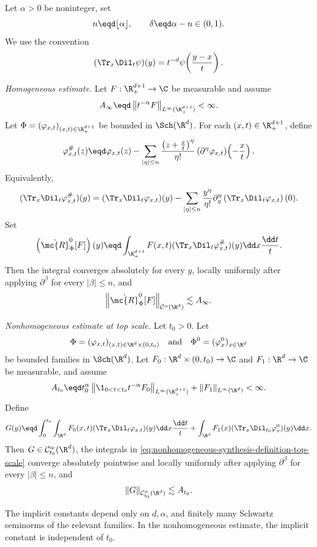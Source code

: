 \begin{proposition} \label{prop:holder-synthesis} Let \(\alpha>0\) be noninteger, set
\[
n\eqd \lfloor\alpha\rfloor,
\qquad
\delta\eqd \alpha-n\in(0,1).
\]
We use the convention
\[
(\Tr_x\Dil_t\psi)(y)=t^{-d}\psi\!\left(\frac{y-x}{t}\right).
\]

\smallskip \noindent \emph{Homogeneous estimate.} Let \(F:\R^{d+1}_+\to\C\) be measurable and assume
\[
A_\infty\eqd
\left\|t^{-\alpha}F\right\|_{L^\infty(\R^{d+1}_+)}
<\infty .
\]
Let \(\Phi=(\varphi_{x,t})_{(x,t)\in\R^{d+1}_+}\) be bounded in \(\Sch(\R^d)\).
For each \((x,t)\in\R^{d+1}_+\), define
\[
\varphi^{\#}_{x,t}(z)
\eqd
\varphi_{x,t}(z)
-
\sum_{|\eta|\le n}
\frac{\left(z+\frac{x}{t}\right)^\eta}{\eta!}
\left(\partial^\eta\varphi_{x,t}\right)\!\left(-\frac{x}{t}\right).
\]
Equivalently,
\[
(\Tr_x\Dil_t\varphi^{\#}_{x,t})(y)
=
(\Tr_x\Dil_t\varphi_{x,t})(y)
-
\sum_{|\eta|\le n}
\frac{y^\eta}{\eta!}
\partial_y^\eta
\left(\Tr_x\Dil_t\varphi_{x,t}\right)(0).
\]
Set
\[
\left(\dot{\mc{R}}^0_{\Phi}[F]\right)(y)
\eqd
\int_{\R^{d+1}_+}
F(x,t)
(\Tr_x\Dil_t\varphi^{\#}_{x,t})(y)
\dd x\frac{\dd t}{t}.
\]
Then the integral converges absolutely for every \(y\), locally uniformly after applying \(\partial^\beta\) for every \(|\beta|\le n\), and
\[
\left\|\dot{\mc{R}}^0_{\Phi}[F]\right\|_{\dot{\mathcal{C}}^\alpha(\R^d)}
\lesssim
A_\infty .
\]

\smallskip \noindent \emph{Nonhomogeneous estimate at top scale.} Let \(t_0>0\).
Let
\[
\Phi=(\varphi_{x,t})_{(x,t)\in\R^d\times(0,t_0)}
\quad\text{and}\quad
\Phi^0=(\varphi^0_x)_{x\in\R^d}
\]
be bounded families in \(\Sch(\R^d)\).
Let \(F_0:\R^d\times(0,t_0)\to\C\) and \(F_1:\R^d\to\C\) be measurable, and assume
\[
A_{t_0}\eqd
t_0^\alpha
\left\|
\1_{0<t<t_0}t^{-\alpha}F_0
\right\|_{L^\infty(\R^{d+1}_+)}
+
\|F_1\|_{L^\infty(\R^d)}
<\infty .
\]
Define
\begin{equation}
\label{eq:nonhomogeneous-synthesis-definition-top-scale}
G(y)
\eqd
\int_0^{t_0}\int_{\R^d}
F_0(x,t)
(\Tr_x\Dil_t\varphi_{x,t})(y)
\dd x\frac{\dd t}{t}
+
\int_{\R^d}
F_1(x)
(\Tr_x\Dil_{t_0}\varphi^0_x)(y)
\dd x .
\end{equation}
Then \(G\in\mathcal{C}^{\alpha}_{t_0}(\R^d)\), the integrals in \eqref{eq:nonhomogeneous-synthesis-definition-top-scale} converge absolutely pointwise and locally uniformly after applying \(\partial^\beta\) for every \(|\beta|\le n\), and
\begin{equation}
\label{eq:holder-synthesis-nonhomogeneous-top-scale}
\|G\|_{\mathcal{C}^{\alpha}_{t_0}(\R^d)}
\lesssim
A_{t_0}.
\end{equation}

The implicit constants depend only on \(d,\alpha\), and finitely many Schwartz seminorms of the relevant families.
In the nonhomogeneous estimate, the implicit constant is independent of \(t_0\).
\end{proposition}

